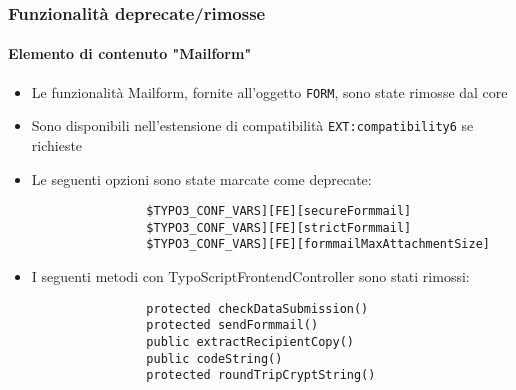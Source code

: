 
\begin{frame}[fragile]
	\frametitle{Funzionalità deprecate/rimosse}
	\framesubtitle{Elemento di contenuto "Mailform"}

	\begin{itemize}

		\item Le funzionalità Mailform, fornite all'oggetto \texttt{FORM}, sono state
				rimosse dal core
		
		\item Sono disponibili nell'estensione di compatibilità \texttt{EXT:compatibility6} se richieste

		\item Le seguenti opzioni sono state marcate come deprecate:

			\begin{lstlisting}
				$TYPO3_CONF_VARS][FE][secureFormmail]
				$TYPO3_CONF_VARS][FE][strictFormmail]
				$TYPO3_CONF_VARS][FE][formmailMaxAttachmentSize]
			\end{lstlisting}

		\item I seguenti metodi con TypoScriptFrontendController sono stati rimossi:

			\begin{lstlisting}
				protected checkDataSubmission()
				protected sendFormmail()
				public extractRecipientCopy()
				public codeString()
				protected roundTripCryptString()
			\end{lstlisting}

	\end{itemize}

\end{frame}


